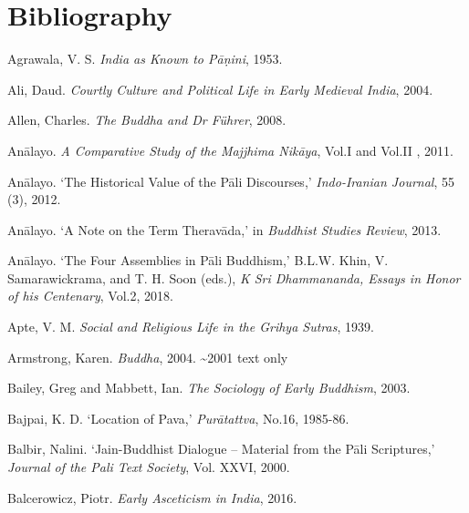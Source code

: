 \label{footprints_split_021.html_calibre_pb_43}

\label{footprints_split_022.html}{}

\section{Bibliography}\label{footprints_split_022.html_TOCTarget999-4}

\label{footprints_split_022.html_Agrawalaux201953}
Agrawala, V. S. \emph{India as Known to Pāṇini}, 1953.

\label{footprints_split_022.html_Aliux202004}
Ali, Daud. \emph{Courtly Culture and Political Life in Early Medieval
India}, 2004.

\label{footprints_split_022.html_Allenux202008}
Allen, Charles. \emph{The Buddha and Dr Führer}, 2008.

\label{footprints_split_022.html_Anux101layoux202011}
Anālayo. \emph{A Comparative Study of the Majjhima Nikāya}, Vol.I and
Vol.II , 2011.

Anālayo. `The Historical Value of the Pāli Discourses,'
\emph{Indo-Iranian Journal}, 55 (3), 2012.

Anālayo. `A Note on the Term Theravāda,' in \emph{Buddhist Studies
Review}, 2013.

\label{footprints_split_022.html_Anux101layoux202018}
Anālayo. `The Four Assemblies in Pāli Buddhism,' B.L.W. Khin, V.
Samarawickrama, and T. H. Soon (eds.), \emph{K Sri Dhammananda, Essays
in Honor of his Centenary}, Vol.2, 2018.

Apte, V. M. \emph{Social and Religious Life in the Grihya Sutras}, 1939.

\label{footprints_split_022.html_Armstrongux202004}
Armstrong, Karen. \emph{Buddha}, 2004. {\textasciitilde2001 text only}

Bailey, Greg and Mabbett, Ian. \emph{The Sociology of Early Buddhism},
2003.

\label{footprints_split_022.html_Bajpaiux201985-86}
Bajpai, K. D. `Location of Pava,' \emph{Purātattva}, No.16, 1985-86.

Balbir, Nalini. `Jain-Buddhist Dialogue -- Material from the Pāli
Scriptures,' \emph{Journal of the Pali Text Society}, Vol. XXVI, 2000.

\label{footprints_split_022.html_Balcerowiczux202016}
Balcerowicz, Piotr. \emph{Early Asceticism in India}, 2016.

